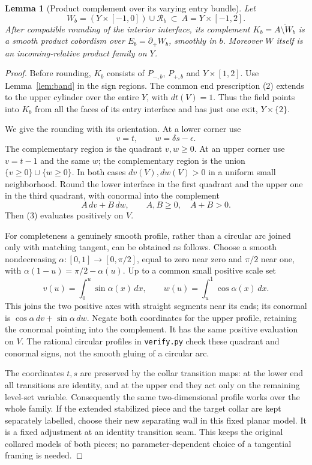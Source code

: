 \documentclass[11pt]{article}
\newtheorem{lemma}[theorem]{Lemma}
\begin{document}
\begin{lemma}[Product complement over its varying entry bundle]
\label{lem:complement}
Let
\[
 W_b=(Y\times[-1,0])\cup\mathcal R_b
 \ \subset\ A=Y\times[-1,2].
\]
After compatible rounding of the interior interface, its complement
$K_b=\overline{A\setminus W_b}$ is a smooth product cobordism
over $E_b=\partial_+W_b$, smoothly in $b$. Moreover $W$ itself
is an incoming-relative product family on $Y$.
\end{lemma}
\begin{proof}
Before rounding, $K_b$ consists of $P_{-,b}$, $P_{+,b}$ and
$Y\times[1,2]$. Use Lemma~\ref{lem:band} in the sign regions.
The common end prescription (2) extends to the upper cylinder over
the entire $Y$, with $dt(V)=1$. Thus the field points into $K_b$
from all the faces of its entry interface and has just one exit,
$Y\times\{2\}$.

We give the rounding with its orientation. At a lower corner use
\[
 v=t,\qquad w=\delta s-\epsilon.
\]
The complementary region is the quadrant $v,w\geq0$. At an upper
corner use $v=t-1$ and the same $w$; the complementary region is
the union $\{v\geq0\}\cup\{w\geq0\}$.
In both cases $dv(V),dw(V)>0$ in a uniform small neighborhood.
Round the lower interface in the first quadrant and the upper one
in the third quadrant, with conormal into the complement
\[
 A\,dv+B\,dw,\qquad A,B\geq0,\quad A+B>0.               \tag{3}
\]
Then (3) evaluates positively on $V$.

For completeness a genuinely smooth profile, rather than a circular arc
joined only with matching tangent, can be obtained as follows.
Choose a smooth nondecreasing $\alpha:[0,1]\to[0,\pi/2]$, equal to
zero near zero and $\pi/2$ near one, with
$\alpha(1-u)=\pi/2-\alpha(u)$. Up to a common small positive scale set
\[
 v(u)=\int_0^u\sin\alpha(x)\,dx,\qquad
 w(u)=\int_u^1\cos\alpha(x)\,dx.
\]
This joins the two positive axes with straight segments near its ends;
its conormal is $\cos\alpha\,dv+\sin\alpha\,dw$.
Negate both coordinates for the upper profile, retaining the conormal
pointing into the complement. It has the same positive evaluation on
$V$. The rational circular profiles in \texttt{verify.py} check these
quadrant and conormal signs, not the smooth gluing of a circular arc.

The coordinates $t,s$ are preserved by the collar transition maps:
at the lower end all transitions are identity, and at the upper end
they act only on the remaining level-set variable. Consequently the
same two-dimensional profile works over the whole family. If the
extended stabilized piece and the target collar are kept separately
labelled, choose their new separating wall in this fixed planar model.
It is a fixed adjustment at an identity transition seam. This keeps
the original collared models of both pieces; no parameter-dependent
choice of a tangential framing is needed.


\end{proof}
\end{document}
